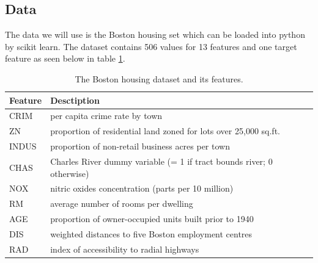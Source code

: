 \documentclass[11pt]{article}
\begin{document}
\subsection*{Data}
The data we will use is the Boston housing set which can be loaded into python by scikit learn. The dataset contains 506 values for 13 features and one target feature as seen below in table \ref{tab:data}.
\begin{table}[H]
    \begin{small}
        \caption{The Boston housing dataset and its features.}
        \label{tab:data}
        \begin{center}
            \begin{tabular}{|l|l|}
                \hline
                \textbf{Feature} & \textbf{Desctiption}                                                     \\
                \hline
                CRIM             & per capita crime rate by town
                \\ \hline
                ZN               & proportion of residential land zoned for lots over 25,000 sq.ft.
                \\ \hline

                INDUS            & proportion of non-retail business acres per town
                \\ \hline

                CHAS             & Charles River dummy variable (= 1 if tract bounds
                river; 0 otherwise)
                \\ \hline

                NOX              & nitric oxides concentration (parts per 10 million)
                \\ \hline

                RM               & average number of rooms per dwelling
                \\ \hline

                AGE              & proportion of owner-occupied units built prior to 1940
                \\ \hline

                DIS              & weighted distances to five Boston employment centres
                \\ \hline

                RAD              & index of accessibility to radial highways
                \\ \hline


\end{tabular}
\end{center}
\end{small}
\end{table}
\end{document}
